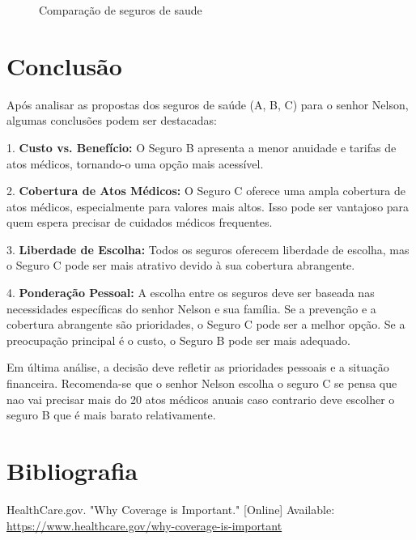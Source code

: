 \documentclass[10pt,a4paper]{article}
\begin{document}
\begin{figure}[!ht]
	\caption{Comparação de seguros de saude}
\end{figure}

\newpage
\section{Conclusão}

Após analisar as propostas dos seguros de saúde (A, B, C) para o senhor Nelson, algumas conclusões podem ser destacadas:

1. \textbf{Custo vs. Benefício:} O Seguro B apresenta a menor anuidade e tarifas de atos médicos, tornando-o uma opção mais acessível.

2. \textbf{Cobertura de Atos Médicos:} O Seguro C oferece uma ampla cobertura de atos médicos, especialmente para valores mais altos. Isso pode ser vantajoso para quem espera precisar de cuidados médicos frequentes.

3. \textbf{Liberdade de Escolha:} Todos os seguros oferecem liberdade de escolha, mas o Seguro C pode ser mais atrativo devido à sua cobertura abrangente.

4. \textbf{Ponderação Pessoal:} A escolha entre os seguros deve ser baseada nas necessidades específicas do senhor Nelson e sua família. Se a prevenção e a cobertura abrangente são prioridades, o Seguro C pode ser a melhor opção. Se a preocupação principal é o custo, o Seguro B pode ser mais adequado.

Em última análise, a decisão deve refletir as prioridades pessoais e a situação financeira. Recomenda-se que o senhor Nelson escolha o seguro C se pensa que nao vai precisar mais do 20 atos médicos anuais caso contrario deve escolher o seguro B que é mais barato relativamente.



\section{Bibliografia}
\begin{thebibliography}{9}
    HealthCare.gov. "Why Coverage is Important." [Online]
    Available: \url{https://www.healthcare.gov/why-coverage-is-important}
\end{thebibliography}

\printindex
\end{document}

